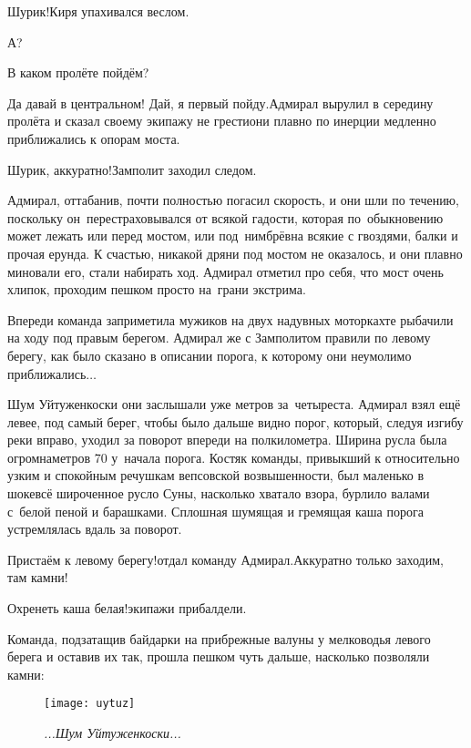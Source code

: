 \diagdash Шурик!\mdash Киря упахивался веслом.

\diagdash А?

\diagdash В каком пролёте пойдём?

\diagdash Да давай в центральном! Дай, я первый пойду.\mdash Адмирал вырулил в середину пролёта и сказал своему экипажу не грести\mdash они плавно по инерции медленно приближались к опорам моста. 

\diagdash Шурик, аккуратно!\mdash Замполит заходил следом.

Адмирал, оттабанив, почти полностью погасил скорость, и они шли по течению, поскольку он~перестраховывался от всякой гадости, которая по~обыкновению может лежать или перед мостом, или под~ним\mdash брёвна всякие с гвоздями, балки и прочая ерунда. К счастью, никакой дряни под мостом не оказалось, и они плавно миновали его, стали набирать ход. Адмирал отметил про себя, что мост очень хлипок, проходим пешком просто на~грани экстрима.

Впереди команда заприметила мужиков на двух надувных моторках\mdash те рыбачили на ходу под правым берегом. Адмирал же с Замполитом правили по левому берегу, как было сказано в описании порога, к которому они неумолимо приближались$\dots$ 

Шум Уйтуженкоски они заслышали уже метров за~четыреста. Адмирал взял ещё левее, под самый берег, чтобы было дальше видно порог, который, следуя изгибу реки вправо, уходил за поворот впереди на полкилометра. Ширина русла была огромна\mdash метров 70 у~начала порога. Костяк команды, привыкший к относительно узким и спокойным речушкам вепсовской возвышенности, был маленько в шоке\mdash всё широченное русло Суны, насколько хватало взора, бурлило валами с~белой пеной и барашками. Сплошная шумящая и гремящая каша порога устремлялась вдаль за поворот.

\diagdash Пристаём к левому берегу!\mdash отдал команду Адмирал.\mdash Аккуратно только заходим, там камни!

\diagdash Охренеть каша белая!\mdash экипажи прибалдели.

Команда, подзатащив байдарки на прибрежные валуны у мелководья левого берега и оставив их так, прошла пешком чуть дальше, насколько позволяли камни:

\begin{figure}[h]
	\centering
	\texttt{[image: uytuz]}
	\caption{\small\textit{...Шум Уйтуженкоски...}}
\end{figure}

